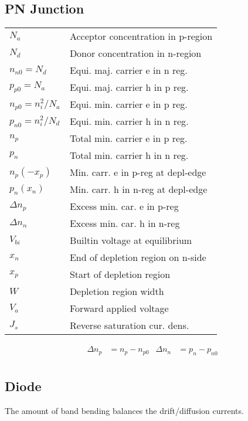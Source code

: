 \documentclass[a4paper, fontsize=8pt, landscape, DIV=1]{scrartcl}
\begin{document}
\begin{multicols*}{4}
  \section{PN Junction}
  \ifdefined\makeultracompact
  \else
    \begin{tabular}[h]{l l}
      $N_a$   & Acceptor concentration in p-region \\
      $N_d$   & Donor concentration in n-region \\
      $n_{n0}=N_d$   & Equi. maj. carrier e in n reg. \\
      $p_{p0}=N_a$   & Equi. maj. carrier h in p reg. \\
      $n_{p0}=n_i^2/N_a$  & Equi. min. carrier e in p reg.  \\
      $p_{n0}=n_i^2/N_d$  & Equi. min. carrier h in n reg.  \\
      $n_p$   &  Total min. carrier e in p reg.\\
      $p_n$   &  Total min. carrier h in n reg.\\
      $n_p(-x_p)$   &  Min. carr. e in p-reg at depl-edge\\
      $p_n(x_n)$    &  Min. carr. h in n-reg at depl-edge\\
      $\Delta n_p$   & Excess min. car. e in p-reg \\
      $\Delta n_n$   & Excess min. car. h in n-reg \\
      $V_{bi}$& Builtin voltage at equilibrium \\
      $x_n$   & End of depletion region on n-side\\
      $x_p$   & Start of depletion region\\
      $W$     & Depletion region width\\
      $V_a$     & Forward applied voltage\\
      $J_s$     & Reverse saturation cur. dens.\\
    \end{tabular}
  \fi
  \begin{align*}
    \Delta n_p &= n_p - n_{p0} & \Delta n_n &= p_n - p_{n0} \\
  \end{align*}

  \subsection{Diode}
    The amount of band bending balances the drift/diffusion currents.


\end{multicols*}
\end{document}
